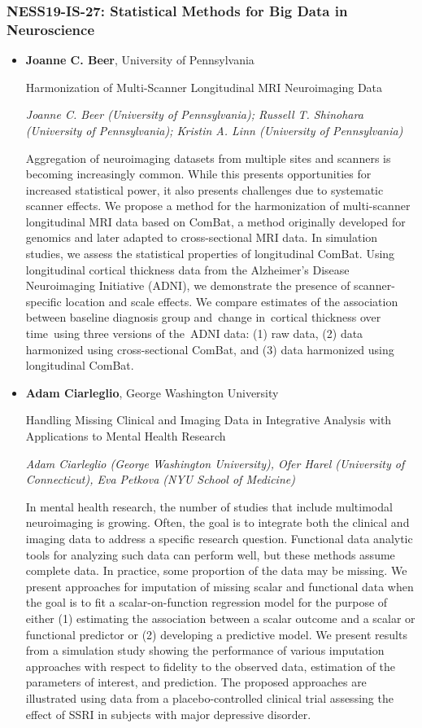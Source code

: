 \subsubsection*{NESS19-IS-27: Statistical Methods for Big Data in Neuroscience}

\begin{itemize}
\item \textbf{Joanne C. Beer}, University of Pennsylvania

Harmonization of Multi-Scanner Longitudinal MRI Neuroimaging Data

\emph{\footnotesize Joanne C. Beer (University of Pennsylvania); Russell T. Shinohara (University of Pennsylvania); Kristin A. Linn (University of Pennsylvania)}

Aggregation of neuroimaging datasets from multiple sites and scanners is becoming increasingly common. While this presents opportunities for increased statistical power, it also presents challenges due to systematic scanner effects. We propose a method for the harmonization of multi-scanner longitudinal MRI data based on ComBat, a method originally developed for genomics and later adapted to cross-sectional MRI data. In simulation studies, we assess the statistical properties of longitudinal ComBat. Using longitudinal cortical thickness data from the Alzheimer’s Disease Neuroimaging Initiative (ADNI), we demonstrate the presence of scanner-specific location and scale effects. We compare estimates of the association between baseline diagnosis group and change in cortical thickness over time using three versions of the ADNI data: (1) raw data, (2) data harmonized using cross-sectional ComBat, and (3) data harmonized using longitudinal ComBat.

\item \textbf{Adam Ciarleglio}, George Washington University

Handling Missing Clinical and Imaging Data in Integrative Analysis with Applications to Mental Health Research

\emph{\footnotesize Adam Ciarleglio (George Washington University), Ofer Harel (University of Connecticut), Eva Petkova (NYU School of Medicine)}

In mental health research, the number of studies that include multimodal neuroimaging is growing.  Often, the goal is to integrate both the clinical and imaging data to address a specific research question.  Functional data analytic tools for analyzing such data can perform well, but these methods assume complete data.  In practice, some proportion of the data may be missing.  We present approaches for imputation of missing scalar and functional data when the goal is to fit a scalar-on-function regression model for the purpose of either (1) estimating the association between a scalar outcome and a scalar or functional predictor or (2) developing a predictive model.  We present results from a simulation study showing the performance of various imputation approaches with respect to fidelity to the observed data, estimation of the parameters of interest, and prediction.  The proposed approaches are illustrated using data from a placebo-controlled clinical trial assessing the effect of SSRI in subjects with major depressive disorder.


\end{itemize}
